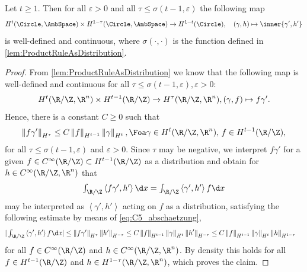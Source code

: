 \begin{lemma}\label{lem:ProductRuleAsDistributionII}
    Let $t \geq 1$.
    Then for all $\varepsilon >0$ and all $\tau \leq \sigma(t-1,\varepsilon)$
    the following map
    \[
        H^t(\Circle,\AmbSpace)
        \times
        H^{1-\tau}(\Circle,\AmbSpace) \to H^{1-t}(\Circle),
        \quad 
        (\gamma,h) \mapsto \inner{\gamma',h'}
    \]
    is well-defined and continuous,
    where $\sigma(\cdot,\cdot)$ is the function defined in \cref{lem:ProductRuleAsDistribution}.
\end{lemma}
\begin{proof}
    From \cref{lem:ProductRuleAsDistribution} we know that the following map is well-defined and continuous for all $ \tau\le \sigma(t-1,\varepsilon),\varepsilon>0 $:
    \begin{align*}
        H^{t}(\R/\Z,\R^n)\times H^{t-1}(\R/\Z)\to H^{\tau}(\R/\Z,\R^n), (\gamma,f)\mapsto f\gamma'.
    \end{align*}
    Hence,  there is a constant $ C\ge 0 $ such that 
    \begin{equation}\label{eq:C5_abschaetzung}
    \begin{aligned}
        \left\|f\gamma' \right\|_{H^{\tau}}\le C\left\|f \right\|_{H^{t-1}}\left\|\gamma \right\|_{H^t},\Foa \gamma\in H^t(\R/\Z,\R^n),\,f\in H^{t-1}(\R/\Z),
    \end{aligned}
    \end{equation}
    for all $ \tau\le \sigma(t-1,\varepsilon)$ and $\varepsilon>0$.
    Since $ \tau $ may be negative, we interpret $ f\gamma' $ for a given $ f\in C^\infty(\R/\Z) \subset H^{t-1}(\R/\Z)$ as a distribution and obtain for $ h\in C^\infty(\R/\Z,\R^n) $ that 
    \begin{align*}\textstyle
        \int_{\R/\Z}\left\langle f\gamma',h' \right\rangle \d x =\int_{\R/\Z}\left\langle \gamma',h' \right\rangle f\d x
    \end{align*}
    may be interpreted as $ \left\langle \gamma',h' \right\rangle  $ acting on $ f $ as a distribution, satisfying the following estimate by means of \cref{eq:C5_abschaetzung},
    \begin{align*}\textstyle
        |\int_{\R/\Z}\left\langle \gamma',h' \right\rangle f\d x |\le \left\|f\gamma' \right\|_{H^{\tau}}\left\|h' \right\|_{H^{-\tau}}&\le C \left\|f \right\|_{H^{t-1}}\left\|\gamma \right\|_{H^{t}}\left\|h' \right\|_{H^{-\tau}}
        \le C \left\|f \right\|_{H^{t-1}}\left\|\gamma \right\|_{H^{t}}\left\|h \right\|_{H^{1-\tau}}
    \end{align*}
    for all $ f\in C^\infty(\R/\Z) $ and $ h\in C^\infty(\R/\Z,\R^n)$. By density \cite[Statement 4, Section 2.3]{AgranovichSobolevSpaces2015} this holds for all $ f\in H^{t-1}(\R/\Z) $ and $ h\in H^{1-\tau}(\R/\Z,\R^n) $, which proves the claim. 
\end{proof}
